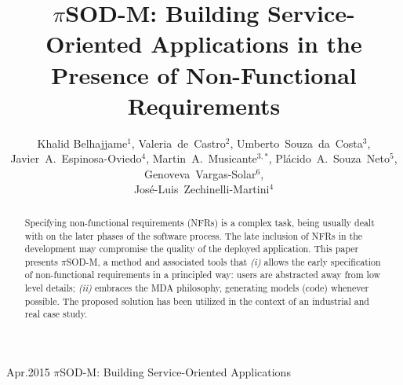 \documentclass[12pt,twoside]{article}
\theoremstyle{plain}
\theoremstyle{plain}
\newcommand{\pisodm}[0]{$\pi$SOD-M\xspace}
\begin{document}
\setcounter{page}{1}

\setpageinformation
{}
{ }{ }{}{Apr.}{2015}
{\pisodm: Building Service-Oriented Applications}


\title{\pisodm: Building Service-Oriented Applications in the Presence of Non-Functional Requirements}

\author{Khalid Belhajjame$^1$, Valeria~de~Castro$^2$, Umberto~Souza~da~Costa$^3$, Javier~A.~Espinosa-Oviedo$^4$, Martin~A.~Musicante$^{3,*}$, Pl\'acido~A.~Souza~Neto$^5$, Genoveva~Vargas-Solar$^6$, \\ Jos\'e-Luis~Zechinelli-Martini$^4$}





\begin{abstract}
Specifying non-functional requirements (NFRs) is a complex task, being usually dealt with on the later phases of the software process.
The late inclusion of NFRs in the development may compromise the quality of the deployed application.
This paper presents \pisodm, a method and associated tools that
\textit{(i)}  allows the early specification of non-functional requirements in a principled way: users are abstracted away from low level details;
\textit{(ii)} embraces the MDA philosophy, generating models (code) whenever possible.
The pro\-po\-sed solution has been utilized in the context of an industrial and real case study.
\end{abstract}
\end{document}

